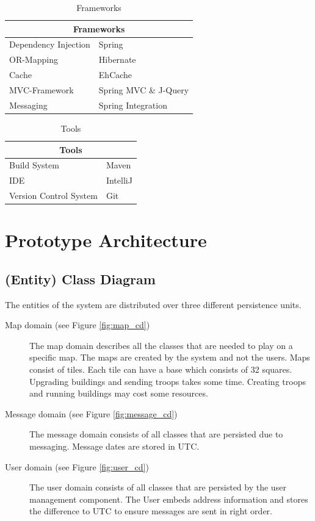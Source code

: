 \documentclass[11pt]{article}
\begin{document}
\begin{table}[h]
	\begin{tabularx}{\textwidth}{| X | X |}
	\hline
	\multicolumn{2}{|c|}{\textbf{Frameworks}} \\
	\hline
	\cellcolor[gray]{0.9}
	Dependency Injection & Spring\\
	\hline
	\cellcolor[gray]{0.9}
	OR-Mapping & Hibernate\\
	\hline
	\cellcolor[gray]{0.9}
	Cache & EhCache\\
	\hline
	\cellcolor[gray]{0.9}
	MVC-Framework & Spring MVC \& J-Query\\
	\hline
	\cellcolor[gray]{0.9}
	Messaging & Spring Integration\\
	\hline
	\end{tabularx}
	\caption{Frameworks}
	\label{frameworks}
\end{table}


\begin{table}[h]
	\begin{tabularx}{\textwidth}{| X | X |}
	\hline
	\multicolumn{2}{|c|}{\textbf{Tools}} \\
	\hline
	\cellcolor[gray]{0.9}
	Build System & Maven\\
	\hline
	\cellcolor[gray]{0.9}
	IDE & IntelliJ\\
	\hline
	\cellcolor[gray]{0.9}
	Version Control System & Git\\
	\hline
	\end{tabularx}
	\caption{Tools}
	\label{tools}
\end{table}

\section{Prototype Architecture}

\subsection{(Entity) Class Diagram}

The entities of the system are distributed over three different persistence units. 

\begin{description}
\item[Map domain (see Figure \ref{fig:map_cd})]
	The map domain describes all the classes that are needed to play on a specific map. The maps are created by the system and not the users. Maps consist of tiles. Each tile can have a base which consists of 32 squares. Upgrading buildings and sending troops takes some time. Creating troops and running buildings may cost some resources.
\item[Message domain (see Figure \ref{fig:message_cd})]
	The message domain consists of all classes that are persisted due to messaging. Message dates are stored in UTC.
\item[User domain (see Figure \ref{fig:user_cd})]
	The user domain consists of all classes that are persisted by the user management component. The User embeds address information and stores the difference to UTC to ensure messages are sent in right order. 
\end{description}
\end{document}

